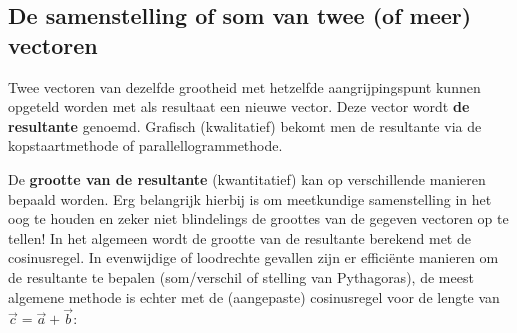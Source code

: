 \documentclass{ximera}
\begin{document}
\subsection*{De samenstelling of som van twee (of meer) vectoren}

Twee vectoren van dezelfde grootheid met hetzelfde aangrijpingspunt kunnen opgeteld worden met als resultaat een nieuwe vector. 
Deze vector wordt \textbf{de resultante} genoemd. 
Grafisch (kwalitatief) bekomt men de resultante via de kopstaartmethode of parallellogrammethode.  %

\begin{image}[0.3\textwidth]
\end{image}


De \textbf{grootte van de resultante} (kwantitatief) kan op verschillende manieren bepaald worden. 
Erg belangrijk hierbij is om meetkundige samenstelling in het oog te houden en zeker niet blindelings de groottes van de gegeven vectoren op te tellen! 
In het algemeen wordt de grootte van de resultante berekend met de cosinusregel. 
In evenwijdige of loodrechte gevallen zijn er efficiënte manieren om de resultante te bepalen (som/verschil of stelling van Pythagoras), de meest algemene methode is echter met de (aangepaste) cosinusregel voor de lengte van $\vec{c} = \vec{a} + \vec{b}$:
\end{document}
